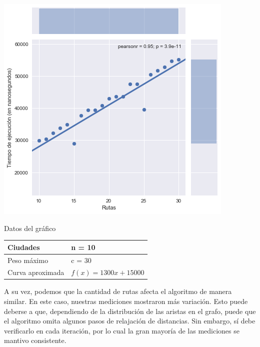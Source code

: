 \noindent
\begin{minipage}{0.55\textwidth}
	\hfill
	\includegraphics[scale=0.6]{imagenes/ej2-2.png}
\end{minipage}
\hfill
\begin{minipage}{0.42\textwidth}
	\begin{center}
		Datos del gráfico

		\begin{tabular}{ | l l |}
			\hline
			Ciudades & n = 10 \\ \hline
			Peso máximo & c = 30 \\ \hline
			Curva aproximada & $f(x) = 1300 x + 15000$ \\
			\hline
		\end{tabular}
	\end{center}
\end{minipage}

A su vez, podemos que la cantidad de rutas afecta el algoritmo de manera similar. En este caso, nuestras mediciones mostraron más variación. Esto puede deberse a que, dependiendo de la distribución de las aristas en el grafo, puede que el algoritmo omita algunos pasos de relajación de distancias. Sin embargo, sí debe verificarlo en cada iteración, por lo cual la gran mayoría de las mediciones se mantivo consistente.

